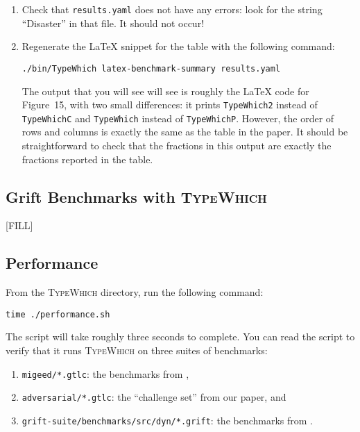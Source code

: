 \documentclass{book}
\newcommand{\system}{\textsc{TypeWhich}\xspace}
\begin{document}
\begin{enumerate}

\item Check that \texttt{results.yaml} does not have any errors: look for the
string ``Disaster'' in that file. It should not occur!

\item Regenerate the LaTeX snippet for the table with the following command:

\begin{verbatim}
./bin/TypeWhich latex-benchmark-summary results.yaml     
\end{verbatim}
The output that you will see will see is roughly the LaTeX code for Figure~15,
with two small differences: it prints \texttt{TypeWhich2} instead of \texttt{TypeWhichC}
and \texttt{TypeWhich} instead of \texttt{TypeWhichP}. However, the order of
rows and columns is exactly the same as the table in the paper. It should be
straightforward to check that the fractions in this output are exactly the fractions
reported in the table.

\end{enumerate}

\subsection{Grift Benchmarks with \system}

[FILL]

\subsection{Performance}

From the \system{} directory, run the following command:
\begin{verbatim}
time ./performance.sh
\end{verbatim}

The script will take roughly three seconds to complete. You can read the script
to verify that it runs \system{} on three suites of benchmarks:
\begin{enumerate}
     \item \texttt{migeed/*.gtlc}: the benchmarks from \citet{migeed:decidable},
     \item \texttt{adversarial/*.gtlc}: the ``challenge set'' from our paper, and
     \item \texttt{grift-suite/benchmarks/src/dyn/*.grift}: the benchmarks from \citet{kuhlenschmidt:grift}.
\end{enumerate}
\end{document}
